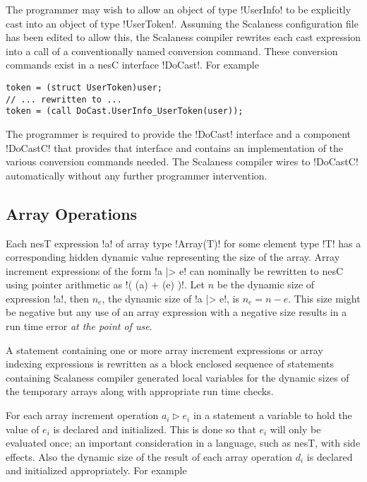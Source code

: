 The programmer may wish to allow an object of type !UserInfo! to be explicitly cast into an
object of type !UserToken!. Assuming the Scalaness configuration file has been edited to allow
this, the Scalaness compiler rewrites each cast expression into a call of a conventionally named
conversion command. These conversion commands exist in a nesC interface !DoCast!. For example

\singlespace
\vspace{1.0ex}
\begin{lstlisting}[language=nesC]
token = (struct UserToken)user;
// ... rewritten to ...
token = (call DoCast.UserInfo_UserToken(user));
\end{lstlisting}
\vspace{1.0ex}
\primaryspacing

The programmer is required to provide the !DoCast! interface and a component !DoCastC! that
provides that interface and contains an implementation of the various conversion commands
needed. The Scalaness compiler wires to !DoCastC! automatically without any further programmer
intervention.


\subsection{Array Operations}
\label{section-array-operations}

Each nesT expression !a! of array type !Array(T)! for some element type !T! has a corresponding
hidden dynamic value representing the size of the array. Array increment expressions of the form
!a |> e! can nominally be rewritten to nesC using pointer arithmetic as !( (a) + (e) )!. Let $n$
be the dynamic size of expression !a!, then $n_e$, the dynamic size of !a |> e!, is $n_e = n -
e$. This size might be negative but any use of an array expression with a negative size results
in a run time error \emph{at the point of use}.

A statement containing one or more array increment expressions or array indexing expressions is
rewritten as a block enclosed sequence of statements containing Scalaness compiler generated
local variables for the dynamic sizes of the temporary arrays along with appropriate run time
checks.

For each array increment operation $a_i \rhd e_i$ in a statement a variable to hold the value of
$e_i$ is declared and initialized. This is done so that $e_i$ will only be evaluated once; an
important consideration in a language, such as nesT, with side effects. Also the dynamic size of
the result of each array operation $d_i$ is declared and initialized appropriately. For example

